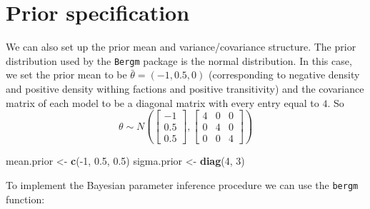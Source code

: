 \documentclass[]{book}
\newenvironment{Shaded}{\begin{snugshade}}{\end{snugshade}}
\newcommand{\KeywordTok}[1]{\textcolor[rgb]{0.13,0.29,0.53}{\textbf{{#1}}}}
\newcommand{\DataTypeTok}[1]{\textcolor[rgb]{0.13,0.29,0.53}{{#1}}}
\newcommand{\DecValTok}[1]{\textcolor[rgb]{0.00,0.00,0.81}{{#1}}}
\newcommand{\FloatTok}[1]{\textcolor[rgb]{0.00,0.00,0.81}{{#1}}}
\newcommand{\StringTok}[1]{\textcolor[rgb]{0.31,0.60,0.02}{{#1}}}
\newcommand{\CommentTok}[1]{\textcolor[rgb]{0.56,0.35,0.01}{\textit{{#1}}}}
\newcommand{\NormalTok}[1]{{#1}}
\begin{document}
\section{Prior specification}\label{prior-specification}

We can also set up the prior mean and variance/covariance structure. The
prior distribution used by the \texttt{Bergm} package is the normal
distribution. In this case, we set the prior mean to be
\(\bar{\theta} = (-1, 0.5, 0)\) (corresponding to negative density and
positive density withing factions and positive transitivity) and the
covariance matrix of each model to be a diagonal matrix with every entry
equal to \(4\). So \[
\theta \sim N \left(\begin{bmatrix}
-1\\ 
0.5\\ 
0.5
\end{bmatrix},
\begin{bmatrix}
4 & 0 & 0\\ 
0 & 4 & 0\\ 
0 & 0 & 4
\end{bmatrix}
\right)
\]

\begin{Shaded}
\begin{Highlighting}[]
\NormalTok{mean.prior <-}\StringTok{ }\KeywordTok{c}\NormalTok{(-}\DecValTok{1}\NormalTok{, }\FloatTok{0.5}\NormalTok{, }\FloatTok{0.5}\NormalTok{)}
\NormalTok{sigma.prior <-}\StringTok{ }\KeywordTok{diag}\NormalTok{(}\DecValTok{4}\NormalTok{, }\DecValTok{3}\NormalTok{)}
\end{Highlighting}
\end{Shaded}

To implement the Bayesian parameter inference procedure we can use the
\texttt{bergm} function:

\begin{Shaded}
\end{Shaded}
\end{document}
